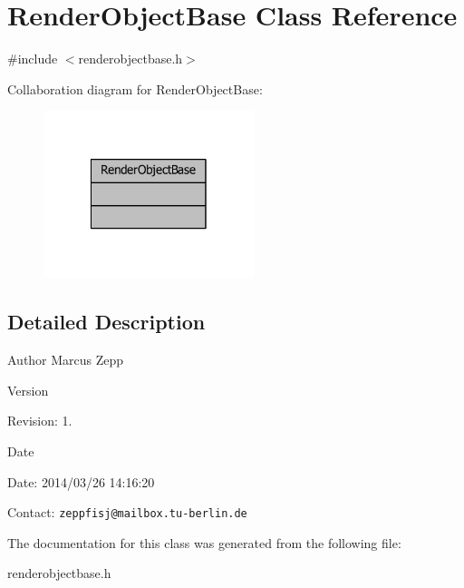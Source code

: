 \section{Render\-Object\-Base Class Reference}
\label{classRenderObjectBase}


{\ttfamily \#include $<$renderobjectbase.\-h$>$}



Collaboration diagram for Render\-Object\-Base\-:
\nopagebreak
\begin{figure}[H]
\begin{center}
\leavevmode
\includegraphics[width=174pt]{d4/d2e/classRenderObjectBase__coll__graph}
\end{center}
\end{figure}


\subsection{Detailed Description}
\begin{DoxyAuthor}{Author}
Marcus Zepp
\end{DoxyAuthor}
\begin{DoxyVersion}{Version}

\end{DoxyVersion}
\begin{DoxyParagraph}{Revision\-:}
1. 
\end{DoxyParagraph}


\begin{DoxyDate}{Date}

\end{DoxyDate}
\begin{DoxyParagraph}{Date\-:}
2014/03/26 14\-:16\-:20 
\end{DoxyParagraph}


Contact\-: {\tt zeppfisj@mailbox.\-tu-\/berlin.\-de} 

The documentation for this class was generated from the following file\-:\begin{DoxyCompactItemize}
\item 
renderobjectbase.\-h\end{DoxyCompactItemize}
